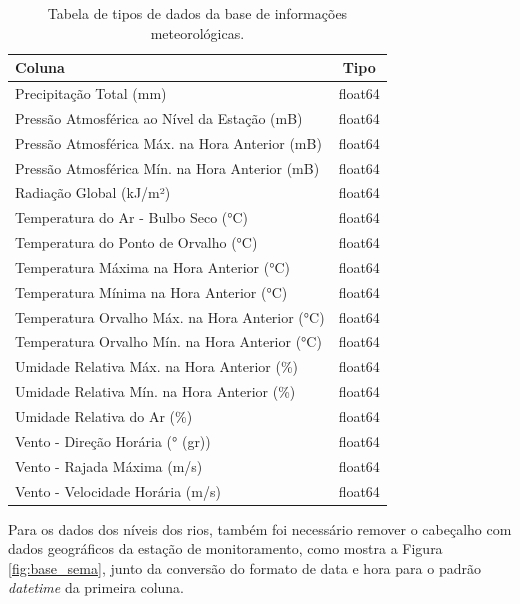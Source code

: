 \begin{table}[H]
	\centering
	\begin{tabular}{|p{10cm}|c|}
	\hline
	\textbf{Coluna} & \textbf{Tipo} \\
	\hline
	Precipitação Total (mm) & float64 \\
	Pressão Atmosférica ao Nível da Estação (mB) & float64 \\
	Pressão Atmosférica Máx. na Hora Anterior (mB) & float64 \\
	Pressão Atmosférica Mín. na Hora Anterior (mB) & float64 \\
	Radiação Global (kJ/m²) & float64 \\
	Temperatura do Ar - Bulbo Seco (°C) & float64 \\
	Temperatura do Ponto de Orvalho (°C) & float64 \\
	Temperatura Máxima na Hora Anterior (°C) & float64 \\
	Temperatura Mínima na Hora Anterior (°C) & float64 \\
	Temperatura Orvalho Máx. na Hora Anterior (°C) & float64 \\
	Temperatura Orvalho Mín. na Hora Anterior (°C) & float64 \\
	Umidade Relativa Máx. na Hora Anterior (\%) & float64 \\
	Umidade Relativa Mín. na Hora Anterior (\%) & float64 \\
	Umidade Relativa do Ar (\%) & float64 \\
	Vento - Direção Horária (° (gr)) & float64 \\
	Vento - Rajada Máxima (m/s) & float64 \\
	Vento - Velocidade Horária (m/s) & float64 \\
	\hline
	\end{tabular}
	\caption{Tabela de tipos de dados da base de informações meteorológicas.}
	\label{tab:colunas_dados_meteorologicos}
\end{table}

Para os dados dos níveis dos rios, também foi necessário remover o cabeçalho com dados geográficos da estação de monitoramento, como mostra a Figura \ref{fig:base_sema}, junto da conversão do formato de data e hora para o padrão \textit{datetime} da primeira coluna.

